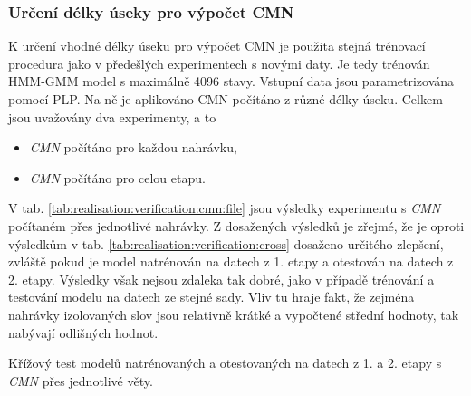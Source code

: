 \subsubsection{Určení délky úseky pro výpočet CMN}

K určení vhodné délky úseku pro výpočet CMN je použita stejná trénovací procedura jako v předešlých experimentech s novými daty. Je tedy trénován HMM-GMM model s maximálně 4096 stavy. Vstupní data jsou parametrizována pomocí PLP. Na ně je aplikováno CMN počítáno z různé délky úseku. Celkem jsou uvažovány dva experimenty, a to

\begin{itemize}
  \item \textit{CMN} počítáno pro každou nahrávku,
  \item \textit{CMN} počítáno pro celou etapu.
\end{itemize}

V tab. \ref{tab:realisation:verification:cmn:file} jsou výsledky experimentu s \textit{CMN} počítaném přes jednotlivé nahrávky. Z dosažených výsledků je zřejmé, že je oproti výsledkům v tab. \ref{tab:realisation:verification:cross} dosaženo určitého zlepšení, zvláště pokud je model natrénován na datech z 1. etapy a otestován na datech z 2. etapy. Výsledky však nejsou zdaleka tak dobré, jako v případě trénování a testování modelu na datech ze stejné sady. Vliv tu hraje fakt, že zejména nahrávky izolovaných slov jsou relativně krátké a vypočtené střední hodnoty, tak nabývají odlišných hodnot.

\begin{table}[htpb]
  \centering
  \def\arraystretch{1.5}
  \caption{Křížový test modelů natrénovaných a otestovaných na datech z 1. a 2. etapy s \textit{CMN}  přes jednotlivé věty.}
  \label{tab:realisation:verification:cmn:file}
\end{table}

